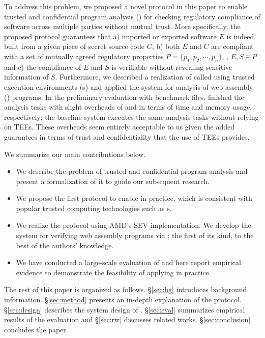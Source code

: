 To address this problem, we proposed a novel protocol in this paper to enable trusted and confidential 
program analysis (\tcpa) for checking regulatory compliance of software across multiple parties without mutual 
trust. More specifically, the proposed protocol guarantees that a) imported or exported software $E$ 
is indeed built from a given piece of secret source code $C$, b) both $E$ and $C$ are compliant with a 
set of mutually agreed regulatory properties $P=\{ p_1, p_2, \cdots, p_n \}$, \ie, $E, S \vDash P$ and 
c) the compliance of $E$ and $S$ is verifiable without revealing sensitive information of $S$. 
Furthermore, we described a realization of \tcpa called \tool using 
trusted execution environments (\tee{}s) and applied the system for analysis of web assembly (\wasm) programs. In the preliminary evaluation with \neval 
benchmark files, \tool finished the analysis tasks with slight overheads of \overheadtime and 
\overheadmemory in terms of time and memory usage, respectively; the baseline system executes the same analysis tasks without relying on TEEs. These overheads seem entirely acceptable to us given the added guarantees in terms of trust and confidentiality that the use of TEEs provides. 


We summarize our main contributions below.
\begin{itemize}[leftmargin=*]
\item We describe the problem of trusted and confidential program analysis and present a 
formalization of it to guide our subsequent research.

\item We propose the first protocol to enable \tcpa in practice, which is consistent with 
popular trusted computing technologies such as \tee{}s. 

\item We realize the protocol using AMD's SEV \tee implementation. We develop the system \tool for verifying web assembly programs 
via \tcpa; the first of its kind, to the best of the authors' knowledge.

\item We have conducted a large-scale evaluation of \tool and here report empirical evidence to 
demonstrate the feasibility of applying \tcpa in practice.
\end{itemize}

The rest of this paper is organized as follows. \S\ref{sec:bg} introduces background information. 
\S\ref{sec:method} presents an in-depth explanation of the \tcpa protocol. \S\ref{sec:design} 
describes the system design of \tool. \S\ref{sec:eval} summarizes empirical results of the 
evaluation and \S\ref{sec:rw} discusses related works. \S\ref{sec:conclusion} concludes the paper.








